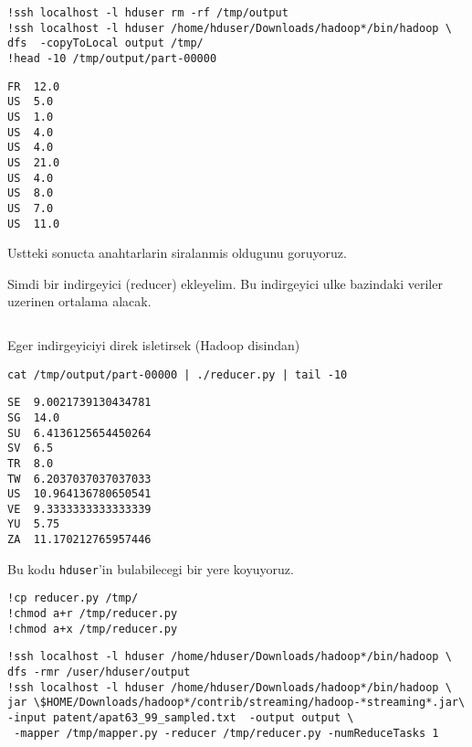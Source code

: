 \documentclass[12pt,fleqn]{article}\usepackage{../common}
\begin{document}
\begin{verbatim}
!ssh localhost -l hduser rm -rf /tmp/output
!ssh localhost -l hduser /home/hduser/Downloads/hadoop*/bin/hadoop \
dfs  -copyToLocal output /tmp/
!head -10 /tmp/output/part-00000
\end{verbatim}

\begin{verbatim}
FR	12.0
US	5.0
US	1.0
US	4.0
US	4.0
US	21.0
US	4.0
US	8.0
US	7.0
US	11.0
\end{verbatim}

Ustteki sonucta anahtarlarin siralanmis oldugunu goruyoruz.

Simdi bir indirgeyici (reducer) ekleyelim. Bu indirgeyici ulke bazindaki
veriler uzerinen ortalama alacak. 

\inputminted[fontsize=\footnotesize]{python}{reducer.py}

Eger indirgeyiciyi direk isletirsek (Hadoop disindan)

\begin{verbatim}
cat /tmp/output/part-00000 | ./reducer.py | tail -10
\end{verbatim}

\begin{verbatim}
SE	9.0021739130434781
SG	14.0
SU	6.4136125654450264
SV	6.5
TR	8.0
TW	6.2037037037037033
US	10.964136780650541
VE	9.3333333333333339
YU	5.75
ZA	11.170212765957446
\end{verbatim}

Bu kodu \verb!hduser!'in bulabilecegi bir yere koyuyoruz. 

\begin{verbatim}
!cp reducer.py /tmp/
!chmod a+r /tmp/reducer.py
!chmod a+x /tmp/reducer.py
\end{verbatim}

\begin{verbatim}
!ssh localhost -l hduser /home/hduser/Downloads/hadoop*/bin/hadoop \
dfs -rmr /user/hduser/output
!ssh localhost -l hduser /home/hduser/Downloads/hadoop*/bin/hadoop \
jar \$HOME/Downloads/hadoop*/contrib/streaming/hadoop-*streaming*.jar\
-input patent/apat63_99_sampled.txt  -output output \
 -mapper /tmp/mapper.py -reducer /tmp/reducer.py -numReduceTasks 1 
\end{verbatim}
\end{document}
